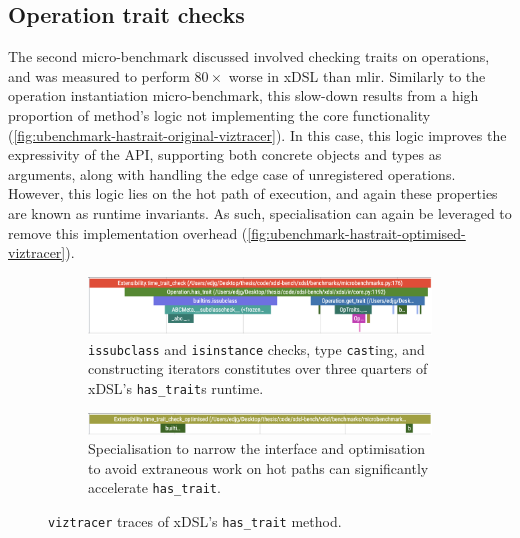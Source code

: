 \subsection{Operation trait checks}
\label{ssec:specialising-ubenchmarks-trait}

The second micro-benchmark discussed involved checking traits on operations, and was measured to perform $80\times$ worse in xDSL than \ac{mlir}.
Similarly to the operation instantiation micro-benchmark, this slow-down results from a high proportion of method's logic not implementing the core functionality (\autoref{fig:ubenchmark-hastrait-original-viztracer}). In this case, this logic improves the expressivity of the API, supporting both concrete objects and types as arguments, along with handling the edge case of unregistered operations. However, this logic lies on the hot path of execution, and again these properties are known as runtime invariants. As such, specialisation can again be leveraged to remove this implementation overhead (\autoref{fig:ubenchmark-hastrait-optimised-viztracer}).

\begin{figure}[H]
    \centering
    \begin{subfigure}[b]{\textwidth}
        \centering
        \includegraphics[width=\textwidth]{images/specialising_optimising_xdsl_rewriting/original_hastrait.png}
        \captionsetup{width=0.8\textwidth}
        \caption{\texttt{issubclass} and \texttt{isinstance} checks, type \texttt{cast}ing, and constructing iterators constitutes over three quarters of xDSL's \texttt{has_trait}s runtime.}
        \label{fig:ubenchmark-hastrait-original-viztracer}
    \end{subfigure}
    \begin{subfigure}[b]{\textwidth}
        \centering
        \includegraphics[width=\textwidth]{images/specialising_optimising_xdsl_rewriting/optimised_hastrait.png}
        \captionsetup{width=0.8\textwidth}
        \caption{Specialisation to narrow the interface and optimisation to avoid extraneous work on hot paths can significantly accelerate \texttt{has_trait}.}
        \label{fig:ubenchmark-hastrait-optimised-viztracer}
    \end{subfigure}
    \caption{\texttt{viztracer} traces of xDSL's \texttt{has_trait} method.}
    \label{fig:ubenchmark-hastrait-viztracer}
\end{figure}

